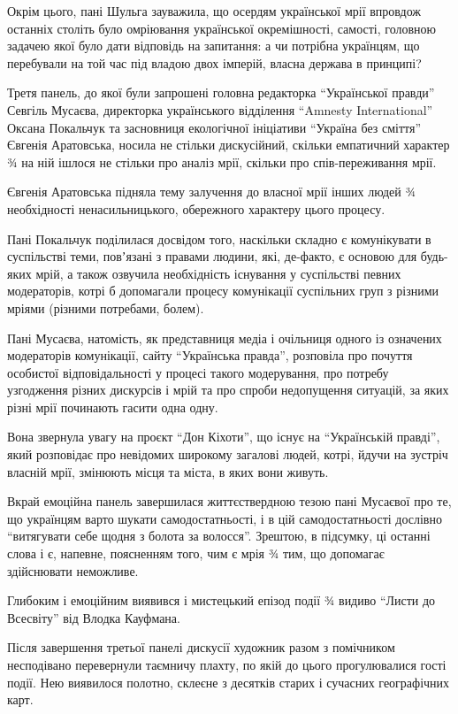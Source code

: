 Окрім цього, пані Шульга зауважила, що осердям української мрії впровдож
останніх століть було омріювання української окремішності, самості, головною
задачею якої було дати відповідь на запитання: а чи потрібна українцям, що
перебували на той час під владою двох імперій, власна держава в принципі?

Третя панель, до якої були запрошені головна редакторка \enquote{Української правди}
Севгіль Мусаєва, директорка українського відділення \enquote{Amnesty International}
Оксана Покальчук та засновниця екологічної ініціативи \enquote{Україна без сміття}
Євгенія Аратовська, носила не стільки дискусійний, скільки емпатичний характер
¾ на ній ішлося не стільки про аналіз мрії, скільки про спів-переживання мрії. 

Євгенія Аратовська підняла тему залучення до власної мрії інших людей ¾
необхідності ненасильницького, обережного характеру цього процесу. 

Пані Покальчук поділилася досвідом того, наскільки складно є комунікувати в
суспільстві теми, повʼязані з правами людини, які, де-факто, є основою для
будь-яких мрій, а також озвучила необхідність існування у суспільстві певних
модераторів, котрі б допомагали процесу комунікації суспільних груп з різними
мріями (різними потребами, болем). 

Пані Мусаєва, натомість, як представниця медіа і очільниця одного із означених
модераторів комунікації, сайту \enquote{Українська правда}, розповіла про почуття
особистої відповідальності у процесі такого модерування, про потребу узгодження
різних дискурсів і мрій та про спроби недопущення ситуацій, за яких різні мрії
починають гасити одна одну. 

Вона звернула увагу на проєкт \enquote{Дон Кіхоти}, що існує на \enquote{Українській правді},
який розповідає про невідомих широкому загалові людей, котрі, йдучи на зустріч
власній мрії, змінюють місця та міста, в яких вони живуть.

Вкрай емоційна панель завершилася життєствердною тезою пані Мусаєвої про те, що
українцям варто шукати самодостатньості, і в цій самодостатньості дослівно
\enquote{витягувати себе щодня з болота за волосся}. Зрештою, в підсумку, ці останні
слова і є, напевне, поясненням того, чим є мрія ¾ тим, що допомагає здійснювати
неможливе.

Глибоким і емоційним виявився і мистецький епізод події ¾ видиво \enquote{Листи до
Всесвіту} від Влодка Кауфмана. 

Після завершення третьої панелі дискусії художник разом з помічником
несподівано перевернули таємничу плахту, по якій до цього прогулювалися гості
події. Нею виявилося полотно, склеєне з десятків старих і сучасних географічних
карт. 

